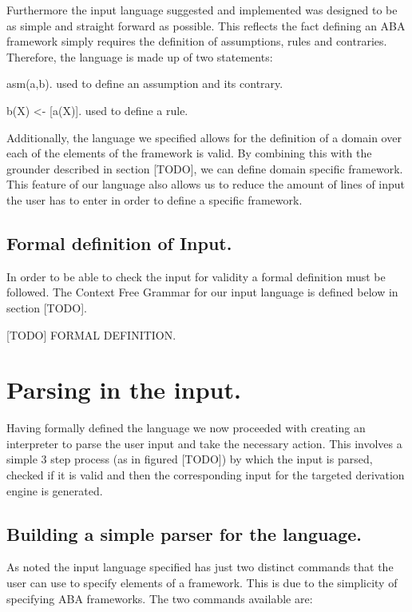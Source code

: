 Furthermore the input language suggested and implemented was designed to be as simple and straight forward as possible. This reflects the fact defining an ABA framework simply requires the definition of assumptions, rules and contraries. Therefore, the language is made up of two statements:

\begin{itemize*}
\item asm(a,b). used to define an assumption and its contrary.
\item b(X) <- [a(X)]. used to define a rule.
\end{itemize*}

Additionally, the language we specified allows for the definition of a domain over each of the elements of the framework is valid. By combining this with the grounder described in section [TODO], we can define domain specific framework. This feature of our language also allows us to reduce the amount of lines of input the user has to enter in order to define a specific framework.

\subsection{Formal definition of Input.}

In order to be able to check the input for validity a formal definition must be followed. The Context Free Grammar for our input language is defined below in section [TODO].

[TODO] FORMAL DEFINITION.

\section{Parsing in the input.}

Having formally defined the language we now proceeded with creating an interpreter to parse the user input and take the necessary action. This involves a simple 3 step process (as in figured [TODO]) by which the input is parsed, checked if it is valid and then the corresponding input for the targeted derivation engine is generated.

\subsection{Building a simple parser for the language.}

As noted the input language specified has just two distinct commands that the user can use to specify elements of a framework. This is due to the simplicity of specifying ABA frameworks. The two commands available are:

